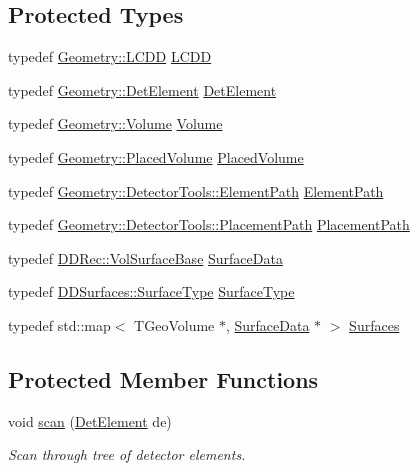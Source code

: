 \subsection*{Protected Types}
\begin{DoxyCompactItemize}
\item 
typedef \hyperlink{class_d_d4hep_1_1_geometry_1_1_l_c_d_d}{Geometry::LCDD} \hyperlink{class_d_d4hep_1_1_surface_installer_a155d137884c31b56d13fb58846e562a3}{LCDD}
\item 
typedef \hyperlink{class_d_d4hep_1_1_geometry_1_1_det_element}{Geometry::DetElement} \hyperlink{class_d_d4hep_1_1_surface_installer_ab88f41bd9efd54b4b67baee892bfa926}{DetElement}
\item 
typedef \hyperlink{class_d_d4hep_1_1_geometry_1_1_volume}{Geometry::Volume} \hyperlink{class_d_d4hep_1_1_surface_installer_a32a727cbf3cfca5204b7eaf344a5304f}{Volume}
\item 
typedef \hyperlink{class_d_d4hep_1_1_geometry_1_1_placed_volume}{Geometry::PlacedVolume} \hyperlink{class_d_d4hep_1_1_surface_installer_a48fe5565640dc158344c63c2fbb9c506}{PlacedVolume}
\item 
typedef \hyperlink{namespace_d_d4hep_1_1_geometry_1_1_detector_tools_a57c8f37a975258fd84676a69e74c56ab}{Geometry::DetectorTools::ElementPath} \hyperlink{class_d_d4hep_1_1_surface_installer_a731a72c192bdf217f206f0a04ff9dea7}{ElementPath}
\item 
typedef \hyperlink{namespace_d_d4hep_1_1_geometry_1_1_detector_tools_a6cc33285199e04dd336a33e6e62925e6}{Geometry::DetectorTools::PlacementPath} \hyperlink{class_d_d4hep_1_1_surface_installer_a73ea611f3129bed899d4282cd126c4e5}{PlacementPath}
\item 
typedef \hyperlink{class_d_d4hep_1_1_d_d_rec_1_1_vol_surface_base}{DDRec::VolSurfaceBase} \hyperlink{class_d_d4hep_1_1_surface_installer_adf9b9c7ac69d57dd6e262891e925be3c}{SurfaceData}
\item 
typedef \hyperlink{class_d_d_surfaces_1_1_surface_type}{DDSurfaces::SurfaceType} \hyperlink{class_d_d4hep_1_1_surface_installer_a8989d1da18081ccd8afbe70a21d0c918}{SurfaceType}
\item 
typedef std::map$<$ TGeoVolume $\ast$, \hyperlink{class_d_d4hep_1_1_d_d_rec_1_1_vol_surface_base}{SurfaceData} $\ast$ $>$ \hyperlink{class_d_d4hep_1_1_surface_installer_a16346209b86955ff4a4a380c3ce1bcd2}{Surfaces}
\end{DoxyCompactItemize}
\subsection*{Protected Member Functions}
\begin{DoxyCompactItemize}
\item 
void \hyperlink{class_d_d4hep_1_1_surface_installer_ade9e70ab94841f49b0c070e1c7a3e16a}{scan} (\hyperlink{class_d_d4hep_1_1_geometry_1_1_det_element}{DetElement} de)
\begin{DoxyCompactList}\small\item\em Scan through tree of detector elements. \item\end{DoxyCompactList}\end{DoxyCompactItemize}
